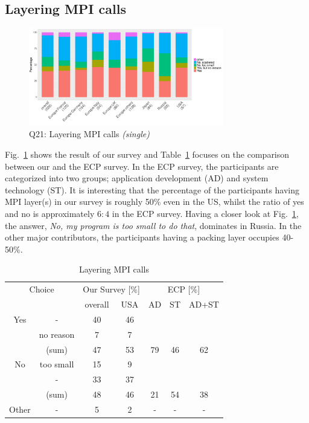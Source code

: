 \documentclass[preprint,5p,times]{elsarticle}
\def\myquote#1{{\it #1}}
\def\mcountries{major contributors\xspace{}}%
\begin{document}
\subsection{Layering MPI calls}\label{sec:mpi-calls}

\begin{figure}[htb]
  \begin{center}
    \includegraphics[width=8.5cm]{R-scripts/Q21.pdf}
    \caption{Q21: Layering MPI calls {\it(single)}}
    \label{fig:layering-mpi-calls}
  \end{center}
\end{figure}

Fig.~\ref{fig:layering-mpi-calls} shows the result of our survey and
Table~\ref{tab:layering-mpi-calls} focuses on the comparison between our
and the ECP survey. In the ECP survey, the participants are categorized
into two groups; application development (AD) and system technology
(ST). It is interesting that the percentage of the participants having
MPI layer(s) in our survey is roughly 50\% even in the US, whilst the
ratio of yes and no is approximately $6:4$ in the ECP survey.
Having a closer look at Fig.~\ref{fig:layering-mpi-calls}, the answer,
\myquote{No, my program is too small to do that}, dominates in Russia. In
the other \mcountries, the participants having a packing layer occupies
40-50\%.

\begin{table}[htb]%
  \small%
  \begin{center}%
    \caption{Layering MPI calls}\label{tab:layering-mpi-calls}%
    \begin{tabular}{c|c||c|c||c|c|c}%
      \hline%
      \multicolumn{2}{c||}{Choice} & \multicolumn{2}{c||}{Our Survey [\%]} &
      \multicolumn{3}{c}{ECP [\%]} \\
      \cline{3-7}%
      \multicolumn{2}{c||}{} & overall & USA & AD & ST & AD+ST \\
      \hline%
      \hline%
      Yes & - & 40 & 46 & & & \\
      & no reason & 7 & 7 & & & \\
      \cline{2-4}%
      & (sum) & 47 & 53 &  79 & 46 & 62 \\
      \hline%
      \hline%
      No & too small & 15 & 9 & & & \\
      & - & 33 & 37 & & & \\
      \cline{2-4}%
      & (sum) & 48 & 46 & 21 & 54 & 38 \\
      \hline%
      \hline%
      Other & - & 5 & 2 & - & - & - \\
      \hline%
    \end{tabular}%
  \end{center}%
\end{table}%
\end{document}
